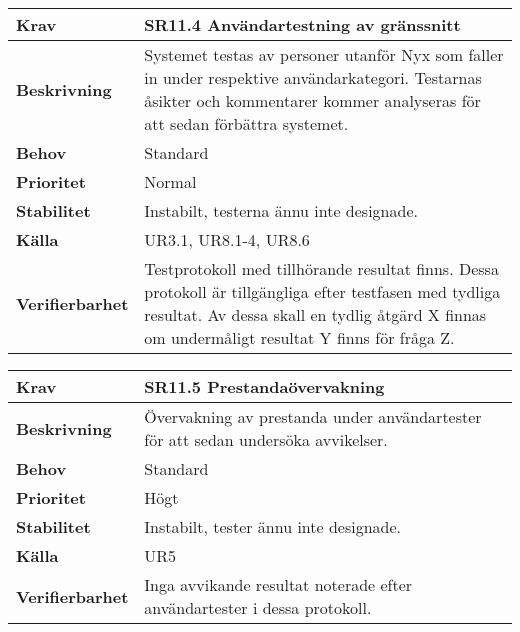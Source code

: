 \documentclass[a4paper, twoside, 11pt, titlepage]{article}
\begin{document}
\begin{tabular} { p{2.6cm} p{12.5cm} }
	\hline
	\sffamily\textbf{Krav} & \sffamily\textbf{SR11.4 Användartestning av gränssnitt  } \\
	\hline
	\sffamily\textbf{Beskrivning} & Systemet testas av personer utanför Nyx som faller in under respektive användarkategori. Testarnas åsikter och kommentarer kommer analyseras för att sedan förbättra systemet.   \\
	\hline
	\sffamily\textbf{Behov} &  Standard   \\
	\hline
	\sffamily\textbf{Prioritet} &  Normal  \\
	\hline
	\sffamily\textbf{Stabilitet} &  Instabilt, testerna ännu inte designade.   \\
	\hline
	\sffamily\textbf{Källa} &  UR3.1, UR8.1-4, UR8.6  \\
	\hline
	\sffamily\textbf{Verifierbarhet} &  Testprotokoll med tillhörande resultat finns. Dessa protokoll är tillgängliga efter testfasen med tydliga resultat. Av dessa skall en tydlig åtgärd X finnas om undermåligt resultat Y finns för fråga Z.   \\
	\hline
\end{tabular}
\vspace{6mm}

\begin{tabular} { p{2.6cm} p{12.5cm} }
	\hline
	\sffamily\textbf{Krav} & \sffamily\textbf{SR11.5 Prestandaövervakning } \\
	\hline
	\sffamily\textbf{Beskrivning} &  Övervakning av prestanda under användartester för att sedan undersöka avvikelser.   \\
	\hline
	\sffamily\textbf{Behov} & Standard  \\
	\hline
	\sffamily\textbf{Prioritet} &  Högt  \\
	\hline
	\sffamily\textbf{Stabilitet} &  Instabilt, tester ännu inte designade.   \\
	\hline
	\sffamily\textbf{Källa} &  UR5   \\
	\hline
	\sffamily\textbf{Verifierbarhet} &  Inga avvikande resultat noterade efter användartester i dessa protokoll.   \\
	\hline
\end{tabular}
\vspace{6mm}
\end{document}
